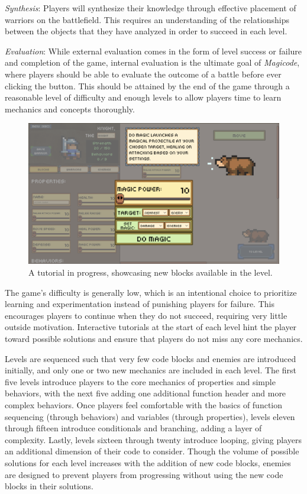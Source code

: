 \documentclass[10pt,twocolumn]{article}
\begin{document}
\textit{Synthesis}: Players will synthesize their knowledge through effective placement of warriors on the battlefield. This requires an understanding of the relationships between the objects that they have analyzed in order to succeed in each level.

\textit{Evaluation}: While external evaluation comes in the form of level success or failure and completion of the game, internal evaluation is the ultimate goal of \textit{Magicode}, where players should be able to evaluate the outcome of a battle before ever clicking the button. This should be attained by the end of the game through a reasonable level of difficulty and enough levels to allow players time to learn mechanics and concepts thoroughly.

\begin{figure}
    \includegraphics[width=\linewidth]{images/screenshots/tutorial.png}
    \caption{A tutorial in progress, showcasing new blocks available in the level.}
    \label{fig:tutorial-screenshot}
\end{figure}

The game’s difficulty is generally low, which is an intentional choice to prioritize learning and experimentation instead of punishing players for failure. This encourages players to continue when they do not succeed, requiring very little outside motivation. Interactive tutorials at the start of each level hint the player toward possible solutions and ensure that players do not miss any core mechanics.

Levels are sequenced such that very few code blocks and enemies are introduced initially, and only one or two new mechanics are included in each level. The first five levels introduce players to the core mechanics of properties and simple behaviors, with the next five adding one additional function header and more complex behaviors. Once players feel comfortable with the basics of function sequencing (through behaviors) and variables (through properties), levels eleven through fifteen introduce conditionals and branching, adding a layer of complexity. Lastly, levels sixteen through twenty introduce looping, giving players an additional dimension of their code to consider. Though the volume of possible solutions for each level increases with the addition of new code blocks, enemies are designed to prevent players from progressing without using the new code blocks in their solutions.
\end{document}
